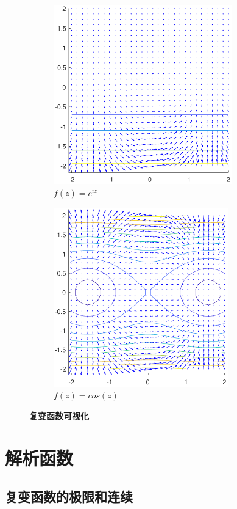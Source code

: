 \documentclass[UTF8]{report}
\theoremstyle{MyLineTheoremStyle} %
\theoremstyle{MyBlockTheoremStyle} %
\theoremstyle{MySubsubsectionStyle} %
\begin{document}
\begin{figure}[H]\centering
    \begin{subfigure}[t]{0.49\textwidth}\centering
        \includegraphics[height=220pt]{assets/e^(iz).pdf}
        \caption{\bfseries $f(z) = e^{iz}$ }
    \end{subfigure}\begin{subfigure}[t]{0.49\textwidth}\centering
        \includegraphics[height=220pt]{assets/cos(iz).pdf}
        \caption{\bfseries $f(z) = cos(z)$ }
    \end{subfigure}
    \caption{\bfseries 复变函数可视化 }\label{可视化2}
\end{figure}

\chapter{解析函数}\thispagestyle{fancy}

\section{复变函数的极限和连续}
\end{document}
